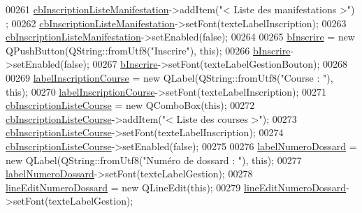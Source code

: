 \begin{DoxyCode}
00261     \hyperlink{class_i_h_m_gestion_cross_a317ffd7cc1c9aa5d6e55c53568e44f98}{cbInscriptionListeManifestation}->addItem(\textcolor{stringliteral}{"< Liste des manifestations >"})
      ;
00262     \hyperlink{class_i_h_m_gestion_cross_a317ffd7cc1c9aa5d6e55c53568e44f98}{cbInscriptionListeManifestation}->setFont(texteLabelInscription);
00263     \hyperlink{class_i_h_m_gestion_cross_a317ffd7cc1c9aa5d6e55c53568e44f98}{cbInscriptionListeManifestation}->setEnabled(\textcolor{keyword}{false});
00264 
00265     \hyperlink{class_i_h_m_gestion_cross_a1afbc04ebd42deafebbbdc998d0fc246}{bInscrire} = \textcolor{keyword}{new} QPushButton(QString::fromUtf8(\textcolor{stringliteral}{"Inscrire"}), \textcolor{keyword}{this});
00266     \hyperlink{class_i_h_m_gestion_cross_a1afbc04ebd42deafebbbdc998d0fc246}{bInscrire}->setEnabled(\textcolor{keyword}{false});
00267     \hyperlink{class_i_h_m_gestion_cross_a1afbc04ebd42deafebbbdc998d0fc246}{bInscrire}->setFont(texteLabelGestionBouton);
00268 
00269     \hyperlink{class_i_h_m_gestion_cross_a88b058cc1d4031891e26eb62409af6bb}{labelInscriptionCourse} = \textcolor{keyword}{new} QLabel(QString::fromUtf8(\textcolor{stringliteral}{"Course : "}), \textcolor{keyword}{this});
00270     \hyperlink{class_i_h_m_gestion_cross_a88b058cc1d4031891e26eb62409af6bb}{labelInscriptionCourse}->setFont(texteLabelInscription);
00271     \hyperlink{class_i_h_m_gestion_cross_aff44e6f1a225ee5b55783afe72049f83}{cbInscriptionListeCourse} = \textcolor{keyword}{new} QComboBox(\textcolor{keyword}{this});
00272     \hyperlink{class_i_h_m_gestion_cross_aff44e6f1a225ee5b55783afe72049f83}{cbInscriptionListeCourse}->addItem(\textcolor{stringliteral}{"< Liste des courses >"});
00273     \hyperlink{class_i_h_m_gestion_cross_aff44e6f1a225ee5b55783afe72049f83}{cbInscriptionListeCourse}->setFont(texteLabelInscription);
00274     \hyperlink{class_i_h_m_gestion_cross_aff44e6f1a225ee5b55783afe72049f83}{cbInscriptionListeCourse}->setEnabled(\textcolor{keyword}{false});
00275 
00276     \hyperlink{class_i_h_m_gestion_cross_a3209e0dfc51bb3a17e2ef700a778178b}{labelNumeroDossard} = \textcolor{keyword}{new} QLabel(QString::fromUtf8(\textcolor{stringliteral}{"Numéro de dossard : "}), \textcolor{keyword}{this});
00277     \hyperlink{class_i_h_m_gestion_cross_a3209e0dfc51bb3a17e2ef700a778178b}{labelNumeroDossard}->setFont(texteLabelGestion);
00278     \hyperlink{class_i_h_m_gestion_cross_adeb4cfc9a218c06fca5cabc280a611e2}{lineEditNumeroDossard} = \textcolor{keyword}{new} QLineEdit(\textcolor{keyword}{this});
00279     \hyperlink{class_i_h_m_gestion_cross_adeb4cfc9a218c06fca5cabc280a611e2}{lineEditNumeroDossard}->setFont(texteLabelGestion);

\end{DoxyCode}
